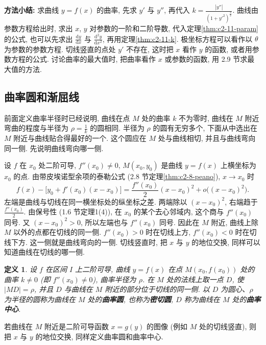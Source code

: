 \documentclass[UTF8,openany]{ctexbook}
\theoremstyle{chinesetextbook}
\newtheorem{definition}{定义}[section]
\newcommand{\dd}{\mathrm d}
\begin{document}
\par\indent\textbf{方法小结:} 求曲线 $y=f(x)$ 的曲率, 先求 $y'$ 与 $y''$, 再代入 $\displaystyle k=\frac{|y''|}{(1+y'^2)^{\frac32}}$. 曲线由参数方程给出时, 求出 $x$, $y$ 对参数的一阶和二阶导数, 代入定理\ref{thm:c2-11-param} 的公式, 也可以先求出 $\displaystyle\frac{\dd y}{\dd x}$ 与 $\displaystyle\frac{\dd^2y}{\dd x^2}$, 再用定理\ref{thm:c2-11-k}. 极坐标方程可以看作以 $\theta$ 为参数的参数方程. 切线竖直的点处 $y'$ 不存在, 这时把 $x$ 看作 $y$ 的函数, 或者用参数方程的公式. 讨论曲率的最大值时, 把曲率看作 $x$ 或参数的函数, 用 2.9 节求最大值的方法.
\subsection{曲率圆和渐屈线}
前面定义曲率半径时已经说明, 曲线在点 $M$ 处的曲率 $k$ 不为零时, 曲线在 $M$ 附近弯曲的程度与半径为 $\displaystyle\rho=\frac1k$ 的圆相同. 半径为 $\rho$ 的圆有无穷多个, 下面从中选出在 $M$ 附近与曲线贴合得最好的一个. 这个圆应在 $M$ 处与曲线相切, 并且与曲线弯向同一侧. 先说明曲线弯向哪一侧.

设 $f$ 在 $x_0$ 处二阶可导, $f''(x_0)\ne0$, $M(x_0,y_0)$ 是曲线 $y=f(x)$ 上横坐标为 $x_0$ 的点. 由带皮埃诺型余项的泰勒公式 (2.8 节定理\ref{thm:c2-8-peano}), $x\to x_0$ 时
\[
f(x)-\bigl[y_0+f'(x_0)(x-x_0)\bigr]=\frac{f''(x_0)}2(x-x_0)^2+o\bigl((x-x_0)^2\bigr).
\]
左端是曲线与切线在同一横坐标处的纵坐标之差. 两端除以 $(x-x_0)^2$, 右端趋于 $\displaystyle\frac{f''(x_0)}2$. 由保号性 (1.6 节定理1(4)), 在 $x_0$ 的某个去心邻域内, 这个商与 $f''(x_0)$ 同号. 又 $(x-x_0)^2>0$, 所以左端也与 $f''(x_0)$ 同号. 因此在 $M$ 附近, 曲线上除 $M$ 以外的点都在切线的同一侧. $f''(x_0)>0$ 时在切线上方, $f''(x_0)<0$ 时在切线下方. 这一侧就是曲线弯向的一侧. 切线竖直时, 把 $x$ 与 $y$ 的地位交换, 同样可以知道曲线在切线的哪一侧.
\begin{definition}\label{def:c2-11-circle}
设 $f$ 在区间 $I$ 上二阶可导, 曲线 $y=f(x)$ 在点 $M(x_0,f(x_0))$ 处的曲率 $k\ne0$ (即 $f''(x_0)\ne0$), 曲率半径为 $\rho$. 在 $M$ 处的法线上取一点 $D$, 使 $|MD|=\rho$, 并且 $D$ 与曲线在 $M$ 附近的部分位于切线的同一侧. 以 $D$ 为圆心、$\rho$ 为半径的圆称为曲线在 $M$ 处的\textbf{曲率圆}, 也称为\textbf{密切圆}, $D$ 称为曲线在 $M$ 处的\textbf{曲率中心}.
\end{definition}
若曲线在 $M$ 附近是二阶可导函数 $x=g(y)$ 的图像 (例如 $M$ 处的切线竖直), 则把 $x$ 与 $y$ 的地位交换, 同样定义曲率圆和曲率中心.
\end{document}
